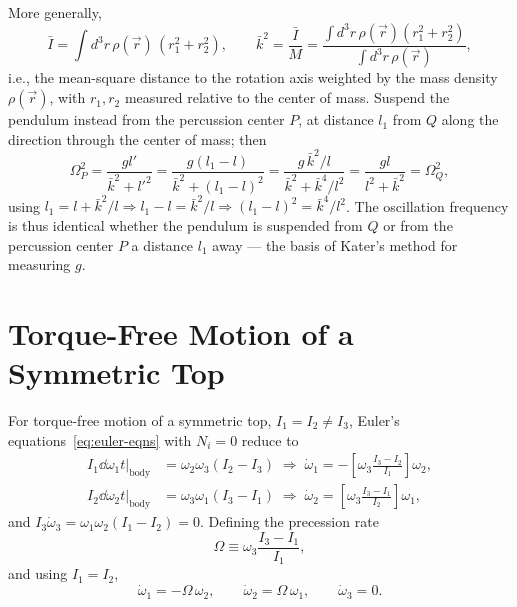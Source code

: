 \documentclass[11pt]{article}
\newcommand{\Om}{\Omega}
\begin{document}
More generally,
\begin{equation}
\bar I = \int d^3r\,\rho(\vec r)\,(r_1^2+r_2^2), \qquad \bar k^2 = \frac{\bar I}{M} = \frac{\int d^3r\,\rho(\vec r)(r_1^2+r_2^2)}{\int d^3r\,\rho(\vec r)},
\label{eq:kater-Ibar}
\end{equation}
i.e., the mean-square distance to the rotation axis weighted by the mass density $\rho(\vec r)$,
with $r_1,r_2$ measured relative to the center of mass. Suspend the pendulum instead from the percussion center $P$, at distance $l_1$ from $Q$ along the direction through the center of mass; then
\begin{equation}
\Om_P^2 = \frac{gl'}{\bar k^2+l'^2} = \frac{g(l_1-l)}{\bar k^2+(l_1-l)^2} = \frac{g\,\bar k^2/l}{\bar k^2+\bar k^4/l^2} = \frac{gl}{l^2+\bar k^2} = \Om_Q^2,
\label{eq:kater-reversal}
\end{equation}
using $l_1=l+\bar k^2/l\Rightarrow l_1-l=\bar k^2/l\Rightarrow(l_1-l)^2=\bar k^4/l^2$. The oscillation frequency is thus identical whether the pendulum is suspended from $Q$ or from the percussion center $P$ a distance $l_1$ away — the basis of Kater's method for measuring $g$.

\section{Torque-Free Motion of a Symmetric Top}

For torque-free motion of a symmetric top, $I_1=I_2\neq I_3$, Euler's equations~\eqref{eq:euler-eqns} with $N_i=0$ reduce to
\begin{align}
I_1\dd{\omega_1}{t}\Big|_{\mathrm{body}} &= \omega_2\omega_3(I_2-I_3) \;\Rightarrow\; \dot\omega_1 = -\left[\omega_3\frac{I_3-I_2}{I_1}\right]\omega_2, \label{eq:sym-top-euler-1}\\
I_2\dd{\omega_2}{t}\Big|_{\mathrm{body}} &= \omega_3\omega_1(I_3-I_1) \;\Rightarrow\; \dot\omega_2 = \left[\omega_3\frac{I_3-I_1}{I_2}\right]\omega_1,
\label{eq:sym-top-euler}
\end{align}
and $I_3\dot\omega_3=\omega_1\omega_2(I_1-I_2)=0$. Defining the precession rate
\begin{equation}
\Om \equiv \omega_3\frac{I_3-I_1}{I_1},
\label{eq:precession-def}
\end{equation}
and using $I_1=I_2$,
\begin{equation}
\boxed{\dot\omega_1 = -\Om\,\omega_2,} \qquad \boxed{\dot\omega_2 = \Om\,\omega_1,} \qquad \boxed{\dot\omega_3=0.}
\label{eq:sym-top-boxed}
\end{equation}
\end{document}
